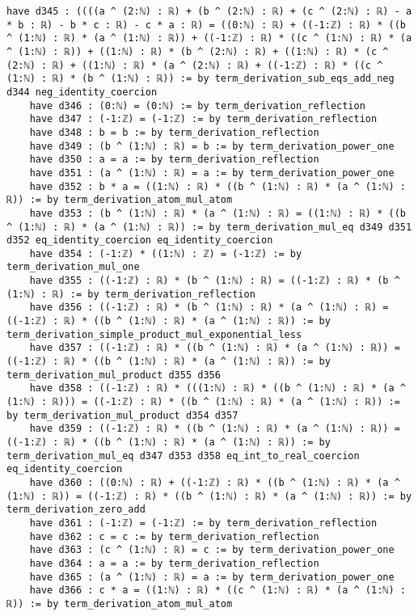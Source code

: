 \documentclass{article}
\begin{document}
\begin{tcolorbox}[colback=white!10, width=\linewidth]
\begin{lstlisting}[language=Lean4]
    have d345 : ((((a ^ (2:ℕ) : ℝ) + (b ^ (2:ℕ) : ℝ) + (c ^ (2:ℕ) : ℝ) - a * b : ℝ) - b * c : ℝ) - c * a : ℝ) = ((0:ℕ) : ℝ) + ((-1:ℤ) : ℝ) * ((b ^ (1:ℕ) : ℝ) * (a ^ (1:ℕ) : ℝ)) + ((-1:ℤ) : ℝ) * ((c ^ (1:ℕ) : ℝ) * (a ^ (1:ℕ) : ℝ)) + ((1:ℕ) : ℝ) * (b ^ (2:ℕ) : ℝ) + ((1:ℕ) : ℝ) * (c ^ (2:ℕ) : ℝ) + ((1:ℕ) : ℝ) * (a ^ (2:ℕ) : ℝ) + ((-1:ℤ) : ℝ) * ((c ^ (1:ℕ) : ℝ) * (b ^ (1:ℕ) : ℝ)) := by term_derivation_sub_eqs_add_neg d344 neg_identity_coercion
    have d346 : (0:ℕ) = (0:ℕ) := by term_derivation_reflection
    have d347 : (-1:ℤ) = (-1:ℤ) := by term_derivation_reflection
    have d348 : b = b := by term_derivation_reflection
    have d349 : (b ^ (1:ℕ) : ℝ) = b := by term_derivation_power_one
    have d350 : a = a := by term_derivation_reflection
    have d351 : (a ^ (1:ℕ) : ℝ) = a := by term_derivation_power_one
    have d352 : b * a = ((1:ℕ) : ℝ) * ((b ^ (1:ℕ) : ℝ) * (a ^ (1:ℕ) : ℝ)) := by term_derivation_atom_mul_atom
    have d353 : (b ^ (1:ℕ) : ℝ) * (a ^ (1:ℕ) : ℝ) = ((1:ℕ) : ℝ) * ((b ^ (1:ℕ) : ℝ) * (a ^ (1:ℕ) : ℝ)) := by term_derivation_mul_eq d349 d351 d352 eq_identity_coercion eq_identity_coercion
    have d354 : (-1:ℤ) * ((1:ℕ) : ℤ) = (-1:ℤ) := by term_derivation_mul_one
    have d355 : ((-1:ℤ) : ℝ) * (b ^ (1:ℕ) : ℝ) = ((-1:ℤ) : ℝ) * (b ^ (1:ℕ) : ℝ) := by term_derivation_reflection
    have d356 : ((-1:ℤ) : ℝ) * (b ^ (1:ℕ) : ℝ) * (a ^ (1:ℕ) : ℝ) = ((-1:ℤ) : ℝ) * ((b ^ (1:ℕ) : ℝ) * (a ^ (1:ℕ) : ℝ)) := by term_derivation_simple_product_mul_exponential_less
    have d357 : ((-1:ℤ) : ℝ) * ((b ^ (1:ℕ) : ℝ) * (a ^ (1:ℕ) : ℝ)) = ((-1:ℤ) : ℝ) * ((b ^ (1:ℕ) : ℝ) * (a ^ (1:ℕ) : ℝ)) := by term_derivation_mul_product d355 d356
    have d358 : ((-1:ℤ) : ℝ) * (((1:ℕ) : ℝ) * ((b ^ (1:ℕ) : ℝ) * (a ^ (1:ℕ) : ℝ))) = ((-1:ℤ) : ℝ) * ((b ^ (1:ℕ) : ℝ) * (a ^ (1:ℕ) : ℝ)) := by term_derivation_mul_product d354 d357
    have d359 : ((-1:ℤ) : ℝ) * ((b ^ (1:ℕ) : ℝ) * (a ^ (1:ℕ) : ℝ)) = ((-1:ℤ) : ℝ) * ((b ^ (1:ℕ) : ℝ) * (a ^ (1:ℕ) : ℝ)) := by term_derivation_mul_eq d347 d353 d358 eq_int_to_real_coercion eq_identity_coercion
    have d360 : ((0:ℕ) : ℝ) + ((-1:ℤ) : ℝ) * ((b ^ (1:ℕ) : ℝ) * (a ^ (1:ℕ) : ℝ)) = ((-1:ℤ) : ℝ) * ((b ^ (1:ℕ) : ℝ) * (a ^ (1:ℕ) : ℝ)) := by term_derivation_zero_add
    have d361 : (-1:ℤ) = (-1:ℤ) := by term_derivation_reflection
    have d362 : c = c := by term_derivation_reflection
    have d363 : (c ^ (1:ℕ) : ℝ) = c := by term_derivation_power_one
    have d364 : a = a := by term_derivation_reflection
    have d365 : (a ^ (1:ℕ) : ℝ) = a := by term_derivation_power_one
    have d366 : c * a = ((1:ℕ) : ℝ) * ((c ^ (1:ℕ) : ℝ) * (a ^ (1:ℕ) : ℝ)) := by term_derivation_atom_mul_atom

\end{lstlisting}
\end{tcolorbox}
\end{document}
